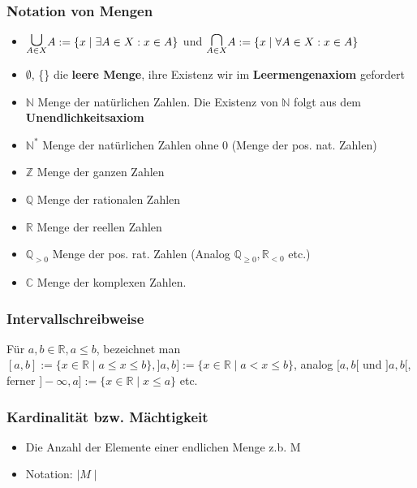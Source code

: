 \documentclass[titlepage]{article}
\newcommand{\C}{\mathbb{C}}
\newcommand{\N}{\mathbb{N}}
\newcommand{\Q}{\mathbb{Q}}
\newcommand{\R}{\mathbb{R}}
\newcommand{\1}{\mathbb{1}}
\newcommand{\0}{\mathbb{0}}
\newcommand{\Z}{\mathbb{Z}}
\begin{document}
				\subsubsection{Notation von Mengen}
					\begin{itemize}
						\item $\underset{A\in X}{\text{\LARGE $\cup$}}A:=\{x\mid\exists A\in X:x\in A\}$ und $\underset{A\in X}{\text{\LARGE $\cap$}}A:=\{x\mid\forall A\in X:x\in A\}$
						\item $\emptyset$, \{\} die \textbf{leere Menge}, ihre Existenz wir im \textbf{Leermengenaxiom} gefordert
						\item $\N$ Menge der natürlichen Zahlen. Die Existenz von $\N$ folgt aus dem \textbf{Unendlichkeitsaxiom}
						\item $\N^*$ Menge der natürlichen Zahlen ohne 0 (Menge der pos. nat. Zahlen)
						\item $\Z$ Menge der ganzen Zahlen
						\item $\Q$ Menge der rationalen Zahlen
						\item $\R$ Menge der reellen Zahlen
						\item $\Q_{>0}$ Menge der pos. rat. Zahlen (Analog $\Q_{\geq0},\R_{<0}$ etc.)
						\item $\C$ Menge der komplexen Zahlen.
					\end{itemize}
				\subsubsection{Intervallschreibweise}
					Für $a,b\in\R,a\le b$, bezeichnet man $[a,b]:=\{x\in\R\mid a\le x\le b\}, ]a,b]:=\{x\in\R\mid a<x\le b\}$, analog $[a,b[$ und $]a,b[$, ferner $]-\infty,a]:=\{x\in\R\mid x\le a\}$ etc.
				\subsubsection{Kardinalität bzw. Mächtigkeit}
					\begin{itemize}
						\item Die Anzahl der Elemente einer endlichen Menge z.b. M
						\item Notation: $\mid M\mid$
					\end{itemize}
\end{document}
